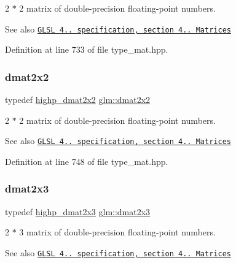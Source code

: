 2 $\ast$ 2 matrix of double-\/precision floating-\/point numbers.

\begin{DoxySeeAlso}{See also}
\href{http://www.opengl.org/registry/doc/GLSLangSpec.4.20.8.pdf}{\tt G\+L\+SL 4.. specification, section 4.. Matrices} 
\end{DoxySeeAlso}


Definition at line 733 of file type\+\_\+mat.\+hpp.

\mbox{\label{group__core__types_gae9932771e11a4f38e21f1136423bab18}} 
\subsubsection{\texorpdfstring{dmat2x2}{dmat2x2}}
{\footnotesize\ttfamily typedef \hyperlink{group__core__precision_gaa5e35f6570d394c1cd34f411a473220c}{highp\+\_\+dmat2x2} \hyperlink{group__core__types_gae9932771e11a4f38e21f1136423bab18}{glm\+::dmat2x2}}

2 $\ast$ 2 matrix of double-\/precision floating-\/point numbers.

\begin{DoxySeeAlso}{See also}
\href{http://www.opengl.org/registry/doc/GLSLangSpec.4.20.8.pdf}{\tt G\+L\+SL 4.. specification, section 4.. Matrices} 
\end{DoxySeeAlso}


Definition at line 748 of file type\+\_\+mat.\+hpp.

\mbox{\label{group__core__types_ga6b5ff9888ca0e468f35b637d4c3a361d}} 
\subsubsection{\texorpdfstring{dmat2x3}{dmat2x3}}
{\footnotesize\ttfamily typedef \hyperlink{group__core__precision_gafec7367665f006f2a7643103c5eddc38}{highp\+\_\+dmat2x3} \hyperlink{group__core__types_ga6b5ff9888ca0e468f35b637d4c3a361d}{glm\+::dmat2x3}}

2 $\ast$ 3 matrix of double-\/precision floating-\/point numbers.

\begin{DoxySeeAlso}{See also}
\href{http://www.opengl.org/registry/doc/GLSLangSpec.4.20.8.pdf}{\tt G\+L\+SL 4.. specification, section 4.. Matrices} 
\end{DoxySeeAlso}



